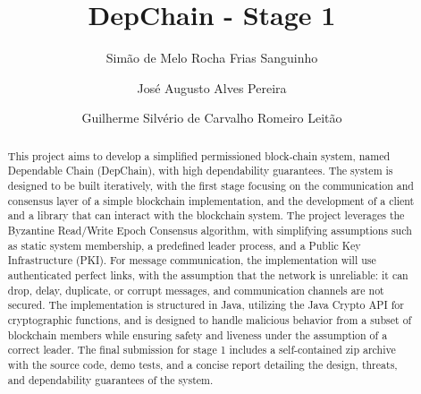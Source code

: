 \documentclass[runningheads]{llncs}
\begin{document}
%
\title{DepChain - Stage 1}
%
%
\author{Simão de Melo Rocha Frias Sanguinho \and José
Augusto Alves Pereira \and Guilherme Silvério de
Carvalho Romeiro Leitão}
%
%
%
\maketitle              %
%
\begin{abstract}
This project aims to develop a simplified permissioned block-chain system, named
Dependable Chain (DepChain), with high dependability guarantees. The system is
designed to be built iteratively, with the first stage focusing on the
communication and consensus layer of a simple blockchain implementation, and the
development of a client and a library that can interact with the blockchain
system. The project leverages the Byzantine Read/Write Epoch Consensus
algorithm, with simplifying assumptions such as static system membership, a
predefined leader process, and a Public Key Infrastructure (PKI). For message
communication, the implementation will use authenticated perfect links, with the
assumption that the  network  is  unreliable:  it  can  drop,  delay, duplicate,
or  corrupt messages, and communication channels are not secured. The
implementation is structured in Java, utilizing the Java Crypto API for
cryptographic functions, and is designed to handle malicious behavior from a
subset of blockchain members while ensuring safety and liveness under the
assumption of a correct leader. The final submission for stage 1 includes a
self-contained zip archive with the source code, demo tests, and a concise
report detailing the design, threats, and dependability guarantees of the
system.
%
\end{abstract}
%
\end{document}

